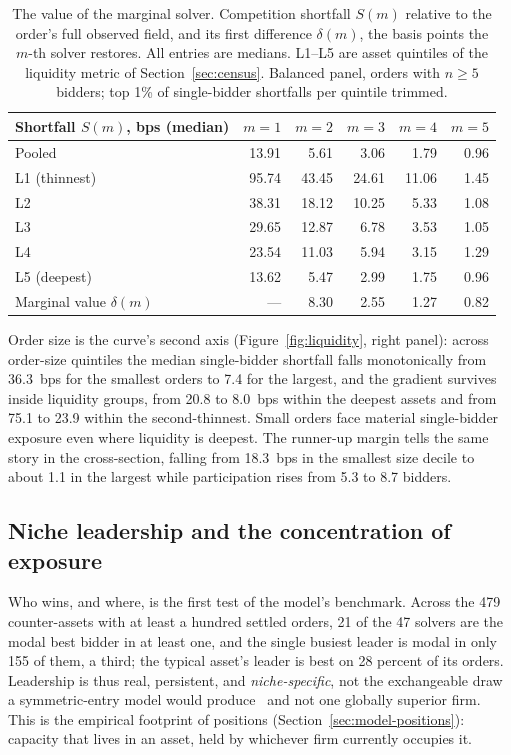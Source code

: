 \documentclass[11pt]{article}
\theoremstyle{plain}
\theoremstyle{definition}
\theoremstyle{remark}
\begin{document}
\begin{table}[t]
\centering
{\fontsize{10}{12}\selectfont
\begin{tabular}{lrrrrr}
\toprule
Shortfall $S(m)$, bps (median) & $m=1$ & $m=2$ & $m=3$ & $m=4$ & $m=5$ \\
\midrule
Pooled          & 13.91 &  5.61 & 3.06 & 1.79 & 0.96 \\
L1 (thinnest)   & 95.74 & 43.45 & 24.61 & 11.06 & 1.45 \\
L2              & 38.31 & 18.12 & 10.25 & 5.33 & 1.08 \\
L3              & 29.65 & 12.87 & 6.78 & 3.53 & 1.05 \\
L4              & 23.54 & 11.03 & 5.94 & 3.15 & 1.29 \\
L5 (deepest)    & 13.62 &  5.47 & 2.99 & 1.75 & 0.96 \\
\midrule
Marginal value $\delta(m)$ & --- & 8.30 & 2.55 & 1.27 & 0.82 \\
\bottomrule
\end{tabular}}
\caption{The value of the marginal solver. Competition shortfall $S(m)$ relative to the order's full observed field, and its first difference $\delta(m)$, the basis points the $m$-th solver restores. All entries are medians. L1--L5 are asset quintiles of the liquidity metric of Section~\ref{sec:census}. Balanced panel, orders with $n \ge 5$ bidders; top 1\% of single-bidder shortfalls per quintile trimmed.}
\label{tab:shortfall}
\end{table}

Order size is the curve's second axis (Figure~\ref{fig:liquidity}, right panel): across order-size quintiles the median single-bidder shortfall falls monotonically from 36.3~bps for the smallest orders to 7.4 for the largest, and the gradient survives inside liquidity groups, from 20.8 to 8.0~bps within the deepest assets and from 75.1 to 23.9 within the second-thinnest. Small orders face material single-bidder exposure even where liquidity is deepest. The runner-up margin tells the same story in the cross-section, falling from 18.3~bps in the smallest size decile to about 1.1 in the largest while participation rises from 5.3 to 8.7 bidders.

\subsection{Niche leadership and the concentration of exposure}\label{sec:pivotal}
Who wins, and where, is the first test of the model's benchmark. Across the 479 counter-assets with at least a hundred settled orders, 21 of the 47 solvers are the modal best bidder in at least one, and the single busiest leader is modal in only 155 of them, a third; the typical asset's leader is best on 28 percent of its orders. Leadership is thus real, persistent, and \emph{niche-specific}, not the exchangeable draw a symmetric-entry model would produce~\citep{levin1994entry} and not one globally superior firm. This is the empirical footprint of positions (Section~\ref{sec:model-positions}): capacity that lives in an asset, held by whichever firm currently occupies it.
\end{document}
